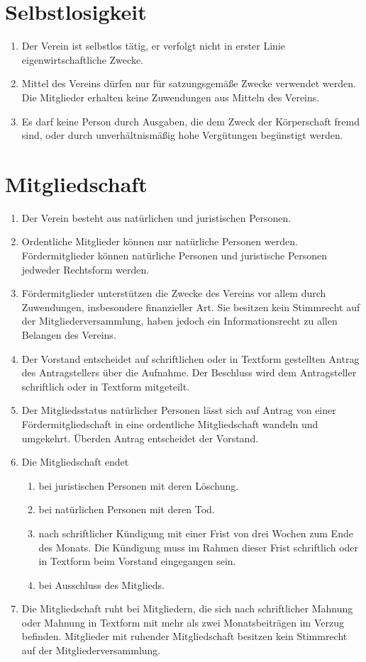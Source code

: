 \documentclass[a4paper, 12pt]{scrartcl}
\begin{document}
\section{Selbstlosigkeit}

\begin{enumerate}
  \item Der Verein ist selbstlos tätig, er verfolgt nicht in erster Linie eigenwirtschaftliche Zwecke.
  \item Mittel des Vereins dürfen nur für satzungsgemäße Zwecke verwendet werden. Die Mitglieder erhalten keine Zuwendungen aus Mitteln des Vereins.
  \item Es darf keine Person durch Ausgaben, die dem Zweck der Körperschaft fremd sind, oder durch unverhältnismäßig hohe Vergütungen begünstigt werden.
\end{enumerate}

\section{Mitgliedschaft}
\begin{enumerate}
  \item Der Verein besteht aus natürlichen und juristischen Personen.
  \item Ordentliche Mitglieder können nur natürliche Personen werden. Fördermitglieder können natürliche Personen und juristische Personen jedweder Rechtsform werden.
  \item Fördermitglieder unterstützen die Zwecke des Vereins vor allem durch Zuwendungen, insbesondere finanzieller Art. Sie besitzen kein Stimmrecht auf der Mitgliederversammlung, haben jedoch ein Informationsrecht zu allen Belangen des Vereins.
  \item Der Vorstand entscheidet auf schriftlichen oder in Textform gestellten Antrag des Antragstellers über die Aufnahme. Der Beschluss wird dem Antragsteller schriftlich oder in Textform mitgeteilt.
  \item Der Mitgliedsstatus natürlicher Personen lässt sich auf Antrag von einer Fördermitgliedschaft in eine ordentliche Mitgliedschaft wandeln und umgekehrt. Überden Antrag entscheidet der Vorstand.
  \item Die Mitgliedschaft endet
  \begin{enumerate}
    \item bei juristischen Personen mit deren Löschung.
    \item bei natürlichen Personen mit deren Tod.
    \item nach schriftlicher Kündigung mit einer Frist von drei Wochen zum Ende des Monats. Die Kündigung muss im Rahmen dieser Frist schriftlich oder in Textform beim Vorstand eingegangen sein.
    \item bei Ausschluss des Mitglieds.
  \end{enumerate}
  \item Die Mitgliedschaft ruht bei Mitgliedern, die sich nach schriftlicher Mahnung oder Mahnung in Textform mit mehr als zwei Monatsbeiträgen im Verzug befinden. Mitglieder mit ruhender Mitgliedschaft besitzen kein Stimmrecht auf der Mitgliederversammlung.
\end{enumerate}
\end{document}
